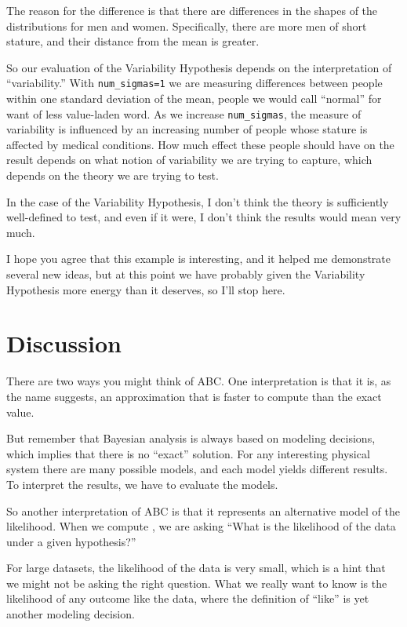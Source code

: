 \documentclass[12pt]{book}
\begin{document}
The reason for the difference is that there are differences in the
shapes of the distributions for men and women.  Specifically, there
are more men of short stature, and their distance from the mean is
greater.

So our evaluation of the Variability Hypothesis depends on the
interpretation of ``variability.''  With \verb"num_sigmas=1" we are
measuring differences between people within one standard deviation of
the mean, people we would call ``normal'' for want of less value-laden
word.  As we increase \verb"num_sigmas", the measure of variability is
influenced by an increasing number of people whose stature is affected
by medical conditions.  How much effect these people should have
on the result depends on what notion of variability we are trying
to capture, which depends on the theory we are trying to test.

In the case of the Variability Hypothesis, I don't think the theory
is sufficiently well-defined to test, and even if it were, I don't
think the results would mean very much.

I hope you agree that this example is interesting, and it helped
me demonstrate several new ideas, but at this point we have probably
given the Variability Hypothesis more energy than it deserves, so
I'll stop here.


\section{Discussion}

There are two ways you might think of ABC.  One interpretation
is that it is, as the name suggests, an approximation that is
faster to compute than the exact value.

But remember that Bayesian analysis is always
based on modeling decisions, which implies that there is no
``exact'' solution.  For any interesting
physical system there are many possible models, and each model
yields different results.  To interpret the results, we have to
evaluate the models.

So another interpretation of ABC is that it represents an alternative
model of the likelihood.  When we compute , we are asking
``What is the likelihood of the data under a given hypothesis?''

For large datasets, the likelihood of the data is very small, which
is a hint that we might not be asking the right question.  What
we really want to know is the likelihood of any outcome
like the data, where the definition of ``like'' is yet another
modeling decision.
\end{document}

